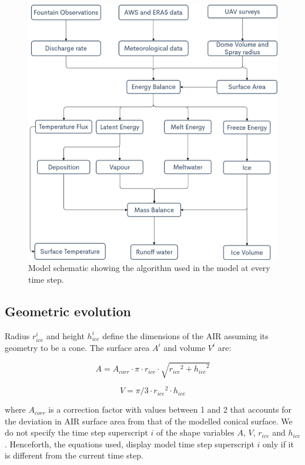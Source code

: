 \documentclass[utf8]{frontiersSCNS} %
\begin{document}
\begin{figure}
	\begin{center}
		\includegraphics[width=12 cm]{Figures/model_schematic.png}
	\end{center}
	\caption{Model schematic showing the algorithm used in the model at every time step. }
	\label{fig:schema}
\end{figure}

\subsection{Geometric evolution}

Radius $r_{ice}^i$ and height $h_{ice}^i$ define the dimensions of the AIR assuming its geometry to be a cone. The
surface area $A^i$ and volume $V^i$ are:

\begin{equation} A = A_{corr} \cdot \pi \cdot r_{ice} \cdot \sqrt{{r_{ice}}^2 + {h_{ice}}^ 2} \label{eqn:A} \end{equation}

\begin{equation} V = \pi/3 \cdot {r_{ice}}^2 \cdot h_{ice} \label{eqn:V} \end{equation}

where $A_{corr}$ is a correction factor with values between 1 and 2 that accounts for the deviation in AIR surface area
from that of the modelled conical surface. We do not specify the time step superscript $i$ of the shape variables
$A$, $V$, $r_{ice}$ and $h_{ice}$. Henceforth, the equations used, display model time step superscript $i$ only if it is
different from the current time step.
\end{document}
